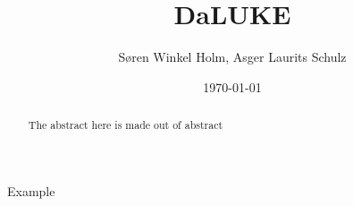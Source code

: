 \documentclass[12pt, fleqn]{article}
\title{DaLUKE}
\author{Søren Winkel Holm, Asger Laurits Schulz}
\date{\today}
\begin{document}
\setlength{\headheight}{15pt}
\addtolength{\topmargin}{-2.5pt}
\maketitle

\begin{abstract}
    The abstract here is made out of abstract
\end{abstract}


\noindent Example \cite{yamada2020luke}

\renewcommand*{\bibfont}{\normalfont\footnotesize}
\printbibliography[heading=bibintoc]

\appendix

\end{document}
